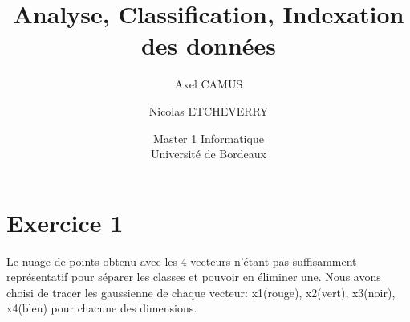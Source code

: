 \documentclass{article}
\begin{document}
\begin{titlepage}
\lstset{language=C}
\title{Analyse, Classification, Indexation des données}
\author{Axel CAMUS
\and
Nicolas ETCHEVERRY}
\date{Master 1 Informatique\\ Université de Bordeaux}
\maketitle
\end{titlepage}

\section{Exercice 1}

Le nuage de points obtenu avec les 4 vecteurs n'étant pas suffisamment représentatif pour séparer les classes et pouvoir en éliminer une. Nous avons choisi de tracer les gaussienne de chaque vecteur: x1(rouge), x2(vert), x3(noir), x4(bleu) pour chacune des dimensions.
\end{document}
